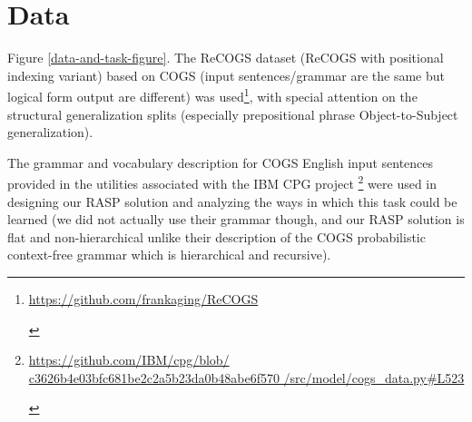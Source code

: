 \documentclass[11pt]{article}
\begin{document}
%
%
%

\section{Data}

Figure \ref{data-and-task-figure}.
The ReCOGS \cite{Wu2023} dataset (ReCOGS with positional indexing variant) based on COGS \cite{KimLinzen2020} (input sentences/grammar are the same but logical form output are different) was used\footnote{\begin{footnotesize}\href{https://github.com/frankaging/ReCOGS}{https://github.com/frankaging/ReCOGS}
\end{footnotesize}}, with special attention on the structural generalization splits (especially prepositional phrase Object-to-Subject generalization).

The grammar and vocabulary description for COGS English input sentences provided in the utilities associated with the IBM CPG project \cite{klinger2024compositionalprogramgenerationfewshot}\footnote{\begin{footnotesize}\href{https://github.com/IBM/cpg/blob/c3626b4e03bfc681be2c2a5b23da0b48abe6f570/src/model/cogs\_data.py\#L523}{https://github.com/IBM/cpg/blob/
c3626b4e03bfc681be2c2a5b23da0b48abe6f570
/src/model/cogs\_data.py\#L523}
\end{footnotesize}}
were used in designing our RASP solution and analyzing the ways in which this task could be learned (we did not actually use their grammar though, and our RASP solution is flat and non-hierarchical unlike their description of the COGS probabilistic context-free grammar which is hierarchical and recursive).
\end{document}
